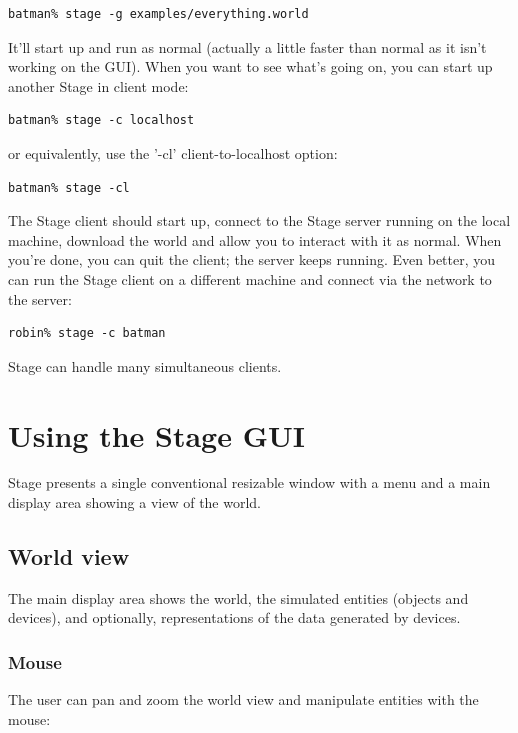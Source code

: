 \documentclass[11pt,twoside]{report}
\begin{document}
\begin{verbatim}
batman% stage -g examples/everything.world 
\end{verbatim}

It'll start up and run as normal (actually a little faster than normal
as it isn't working on the GUI). When you want to see what's going on, you can start up another Stage in client mode:

\begin{verbatim}
batman% stage -c localhost
\end{verbatim}

or equivalently, use the '-cl' client-to-localhost option:

\begin{verbatim}
batman% stage -cl
\end{verbatim}

The Stage client should start up, connect to the Stage server running
on the local machine, download the world and allow you to interact
with it as normal. When you're done, you can quit the client; the
server keeps running. Even better, you can run the Stage client on a
different machine and connect via the network to the server:

\begin{verbatim}
robin% stage -c batman
\end{verbatim}

Stage can handle many simultaneous clients.

\chapter{Using the Stage GUI}

Stage presents a single conventional resizable window with a menu and
a main display area showing a view of the world.

\section{World view}
The main display area shows the world, the simulated entities (objects
and devices), and optionally, representations of the data generated
by devices. 

\subsection{Mouse}
The user can pan and zoom the world view and manipulate entities with
the mouse:
\end{document}
